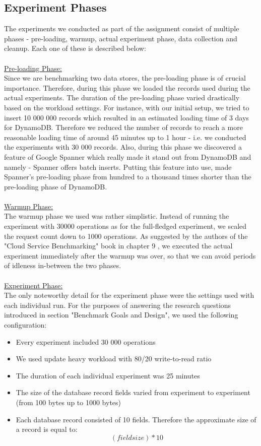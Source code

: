 \documentclass[letterpaper, 10 pt, conference]{ieeeconf}  %
\begin{document}
\subsection{Experiment Phases}
The experiments we conducted as part of the assignment consist of multiple phases - pre-loading, warmup, actual experiment phase, data collection and cleanup. Each one of these is described below:
\\
\\
\underline{Pre-loading Phase:}
\\
Since we are benchmarking two data stores, the pre-loading phase is of crucial importance. Therefore, during this phase we loaded the records used during the actual experiments. The duration of the pre-loading phase varied drastically based on the workload settings. For instance, with our initial setup, we tried to insert 10 000 000 records which resulted in an estimated loading time of 3 days for DynamoDB. Therefore we reduced the number of records to reach a more reasonable loading time of around 45 minutes up to 1 hour - i.e. we conducted the experiments with 30 000 records. Also, during this phase we discovered a feature of Google Spanner which really made it stand out from DynamoDB and namely - Spanner offers batch inserts. Putting this feature into use, made Spanner's pre-loading phase from hundred to a thousand times shorter than the pre-loading phase of DynamoDB. 
\\
\\
\underline{Warmup Phase:}
\\
The warmup phase we used was rather simplistic. Instead of running the experiment with 30000 operations as for the full-fledged experiment, we scaled the request count down to 1000 operations. As suggested by the authors of the "Cloud Service Benchmarking" book in chapter 9 \cite{StefanTaiBook}, we executed the actual experiment immediately after the warmup was over, so that we can avoid periods of idleness in-between the two phases.
\\
\\
\underline{Experiment Phase:}
\\
The only noteworthy detail for the experiment phase were the settings used with each individual run. For the purposes of answering the research questions introduced in section "Benchmark Goals and Design", we used the following configuration:
\begin{itemize}
    \item Every experiment included 30 000 operations
    \item We used update heavy workload with 80/20 write-to-read ratio
    \item The duration of each individual experiment was 25 minutes
    \item The size of the database record fields varied from experiment to experiment (from 100 bytes up to 1000 bytes)
    \item Each database record consisted of 10 fields. Therefore the approximate size of a record is equal to:
    $$
    (field size) * 10
    $$
\end{itemize}
\end{document}
